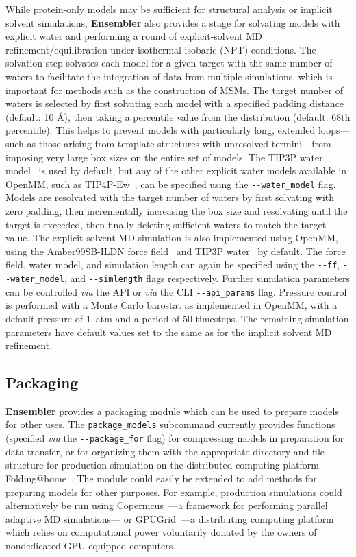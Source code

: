 \documentclass[aps,pre,twocolumn,nofootinbib,superscriptaddress,linenumbers]{revtex4-1}
\begin{document}
While protein-only models may be sufficient for structural analysis or implicit solvent simulations, {\bf Ensembler} also provides a stage for solvating models with explicit water and performing a round of explicit-solvent MD refinement/equilibration under isothermal-isobaric (NPT) conditions.
The solvation step solvates each model for a given target with the same number of waters to facilitate the integration of data from multiple simulations, which is important for methods such as the construction of MSMs.
The target number of waters is selected by first solvating each model with a specified padding distance (default: 10 \AA), then taking a percentile value from the distribution (default: 68th percentile).
This helps to prevent models with particularly long, extended loops---such as those arising from template structures with unresolved termini---from imposing very large box sizes on the entire set of models.
The TIP3P water model~\cite{tip3p} is used by default, but any of the other explicit water models available in OpenMM, such as TIP4P-Ew~\cite{tip4p-ew}, can be specified using the {\tt -{}-water\_model} flag.
Models are resolvated with the target number of waters by first solvating with zero padding, then incrementally increasing the box size and resolvating until the target is exceeded, then finally deleting sufficient waters to match the target value.
The explicit solvent MD simulation is also implemented using OpenMM, using the Amber99SB-ILDN force field~\cite{amber99sb-ildn} and TIP3P water~\cite{tip3p} by default.
The force field, water model, and simulation length can again be specified using the {\tt -{}-ff}, {\tt -{}-water\_model}, and {\tt -{}-simlength} flags respectively.
Further simulation parameters can be controlled \emph{via} the API or \emph{via} the CLI {\tt -{}-api\_params} flag.
Pressure control is performed with a Monte Carlo barostat as implemented in OpenMM, with a default pressure of 1~atm and a period of 50 timesteps.
The remaining simulation parameters have default values set to the same as for the implicit solvent MD refinement.

\subsection*{Packaging}

{\bf Ensembler} provides a packaging module which can be used to prepare models for other uses.
The {\tt package\_models} subcommand currently provides functions (specified \emph{via} the {\tt -{}-package\_for} flag) for compressing models in preparation for data transfer, or for organizing them with the appropriate directory and file structure for production simulation on the distributed computing platform Folding@home~\cite{shirts-pande:science:2000:fah}.
The module could easily be extended to add methods for preparing models for other purposes.
For example, production simulations could alternatively be run using Copernicus~\cite{pronk:2011:copernicus}---a framework for performing parallel adaptive MD simulations--- or GPUGrid~\cite{buch:2010:gpugrid}---a distributing computing platform which relies on computational power voluntarily donated by the owners of nondedicated GPU-equipped computers.
\end{document}
